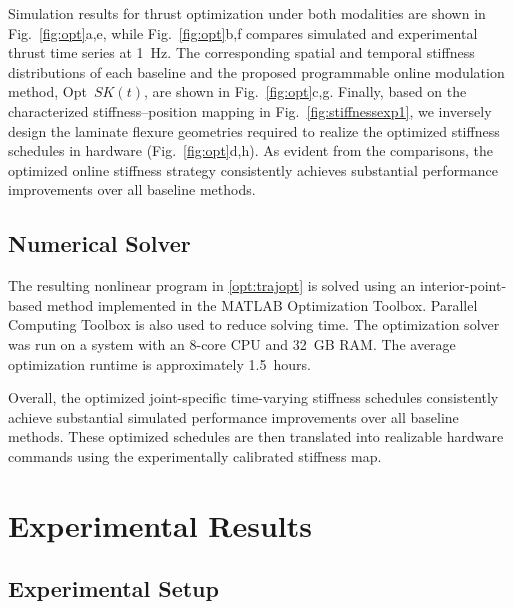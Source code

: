Simulation results for thrust optimization under both modalities are shown in Fig.~\ref{fig:opt}a,e, while Fig.~\ref{fig:opt}b,f compares simulated and experimental thrust time series at 1~Hz. The corresponding spatial and temporal stiffness distributions of each baseline and the proposed programmable online modulation method, Opt~\(SK(t)\), are shown in Fig.~\ref{fig:opt}c,g. Finally, based on the characterized stiffness--position mapping in Fig.~\ref{fig:stiffnessexp1}, we inversely design the laminate flexure geometries required to realize the optimized stiffness schedules in hardware (Fig.~\ref{fig:opt}d,h). As evident from the comparisons, the optimized online stiffness strategy consistently achieves substantial performance improvements over all baseline methods.

\subsection{Numerical Solver}

The resulting nonlinear program in \eqref{opt:trajopt} is solved using an interior-point-based method implemented in the MATLAB Optimization Toolbox. Parallel Computing Toolbox is also used to reduce solving time. The optimization solver was run on a system with an 8-core CPU and 32~GB RAM. The average optimization runtime is approximately 1.5~hours.

Overall, the optimized joint-specific time-varying stiffness schedules consistently achieve substantial simulated performance improvements over all baseline methods. These optimized schedules are then translated into realizable hardware commands using the experimentally calibrated stiffness map.

\section{Experimental Results}
\label{sec:POSM_experiments}

\subsection{Experimental Setup}

